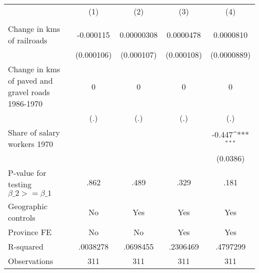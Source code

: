 {
\def\sym#1{\ifmmode^{#1}\else\(^{#1}\)\fi}
\begin{tabular}{l*{4}{c}}
\hline\hline
                &\multicolumn{1}{c}{(1)}&\multicolumn{1}{c}{(2)}&\multicolumn{1}{c}{(3)}&\multicolumn{1}{c}{(4)}\\
                &\multicolumn{1}{c}{}&\multicolumn{1}{c}{}&\multicolumn{1}{c}{}&\multicolumn{1}{c}{}\\
\hline
Change in kms of railroads&-0.000115         &0.00000308         &0.0000478         &0.0000810         \\
                &(0.000106)         &(0.000107)         &(0.000108)         &(0.0000889)         \\
[1em]
Change in kms of paved and gravel roads 1986-1970&        0         &        0         &        0         &        0         \\
                &      (.)         &      (.)         &      (.)         &      (.)         \\
[1em]
Share of salary workers 1970&                  &                  &                  &   -0.447\sym{***}\\
                &                  &                  &                  & (0.0386)         \\
\hline
P-value for testing $\beta\_{2} >= \beta\_{1}$&     .862         &     .489         &     .329         &     .181         \\
Geographic controls&       No         &      Yes         &      Yes         &      Yes         \\
Province FE     &       No         &       No         &      Yes         &      Yes         \\
R-squared       & .0038278         & .0698455         & .2306469         & .4797299         \\
Observations    &      311         &      311         &      311         &      311         \\
\hline\hline
\end{tabular}
}
